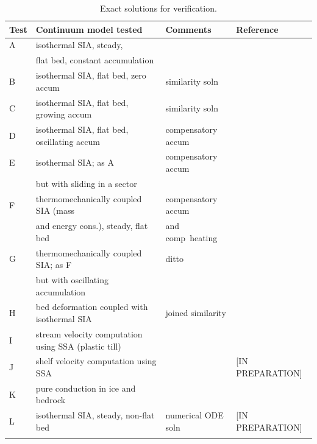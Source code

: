 \documentclass[11pt,final]{amsart}
\begin{document}
\begin{table}[ht]
\caption{Exact solutions for verification.}\label{tab:tests}
\small
\begin{tabular}{@{}llll}\hline
\textbf{Test} & \textbf{Continuum model tested} & \textbf{Comments} & \textbf{Reference} \\ \hline
A & isothermal SIA, steady, &  & \cite{BLKCB} \\
 & flat bed, constant accumulation &  &  \\
B & isothermal SIA, flat bed, zero accum & similarity soln & \cite{BLKCB} \\
C & isothermal SIA, flat bed, growing accum & similarity soln & \cite{BLKCB} \\
D & isothermal SIA, flat bed, oscillating accum & compensatory accum & \cite{BLKCB} \\
E & isothermal SIA; as A &  compensatory accum & \cite{BLKCB} \\
 & but with sliding in a sector &  &  \\
F & thermomechanically coupled SIA (mass &  compensatory accum & \cite{BB,BBL} \\
 & and energy cons.), steady, flat bed & and comp~heating &  \\
G & thermomechanically coupled SIA; as F  & ditto & \cite{BB,BBL} \\
 & but with oscillating accumulation &  &  \\
H & bed deformation coupled with isothermal SIA & joined similarity & \cite{BLKfastearth} \\
I & stream velocity computation using SSA (plastic till) &  & \cite{SchoofStream} \\
J & shelf velocity computation using SSA  &  & [IN PREPARATION] \\
K & pure conduction in ice and bedrock & & \cite{BuelerTestK} \\
L & isothermal SIA, steady, non-flat bed & numerical ODE soln & [IN PREPARATION] \\
\hline
\normalsize
\end{tabular}
\end{table}
\end{document}
